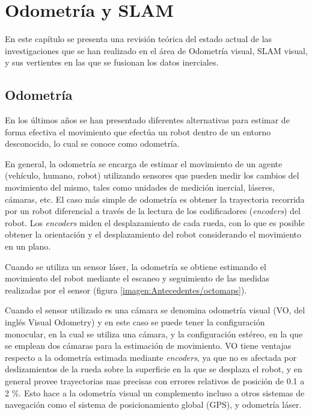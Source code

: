 \chapter{Odometría y SLAM}
\label{capitulo2}

En este capítulo se presenta una revisión teórica del estado actual de las investigaciones que se han realizado en el área de Odometría visual, SLAM visual, y sus vertientes en las que se fusionan los datos inerciales.

\section{Odometría}

En los últimos años se han presentado diferentes alternativas para estimar de forma efectiva el movimiento que efectúa un robot dentro de un entorno desconocido, lo cual se conoce como odometría.

En general, la odometría se encarga de estimar el movimiento de un agente (vehículo, humano, robot) utilizando sensores que pueden medir los cambios del movimiento del mismo, tales como unidades de medición inercial, láseres, cámaras, etc. El caso más simple de odometría es obtener la trayectoria recorrida por un robot diferencial a través de la lectura de los codificadores (\textit{encoders}) del robot. Los \textit{encoders} miden el desplazamiento de cada rueda, con lo que es posible obtener la orientación y el desplazamiento del robot considerando el movimiento en un plano.

Cuando se utiliza un sensor láser, la odometría se obtiene estimando el movimiento del robot mediante el escaneo y seguimiento de las medidas realizadas por el sensor (figura \ref{imagen:Antecedentes/octomaps}).

Cuando el sensor utilizado es una cámara se denomina odometría visual (VO, del inglés Visual Odometry) y en este caso se puede tener la configuración monocular, en la cual se utiliza una cámara, y la configuración estéreo, en la que se emplean dos cámaras para la estimación de movimiento. VO tiene ventajas respecto a la odometría estimada mediante \textit{encoders}, ya que no es afectada por deslizamientos de la rueda sobre la superficie en la que se desplaza el robot, y en general provee trayectorias mas precisas con errores relativos de posición de 0.1 a 2 \%. Esto hace a la odometría visual un complemento incluso a otros sistemas de navegación como el sistema de posicionamiento global (GPS), y odometría láser.

